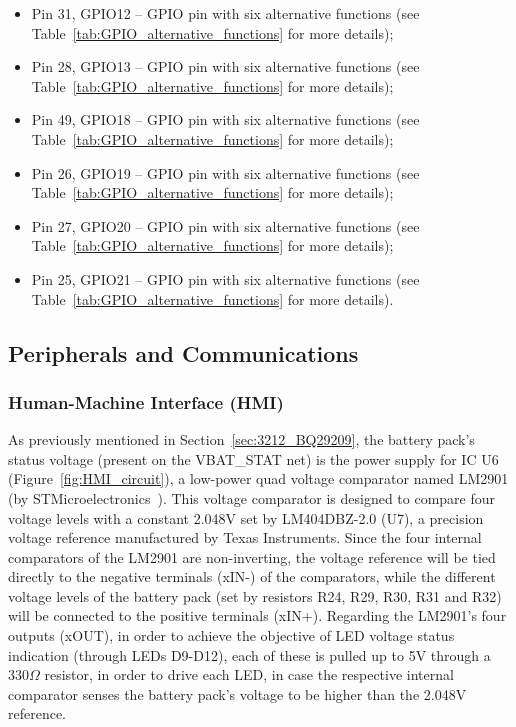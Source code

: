 \begin{itemize}
	\item Pin 31, GPIO12 -- GPIO pin with six alternative functions (see Table~\ref{tab:GPIO_alternative_functions} for more details);

	\item Pin 28, GPIO13 -- GPIO pin with six alternative functions (see Table~\ref{tab:GPIO_alternative_functions} for more details);

	\item Pin 49, GPIO18 -- GPIO pin with six alternative functions (see Table~\ref{tab:GPIO_alternative_functions} for more details);

	\item Pin 26, GPIO19 -- GPIO pin with six alternative functions (see Table~\ref{tab:GPIO_alternative_functions} for more details);

	\item Pin 27, GPIO20 -- GPIO pin with six alternative functions (see Table~\ref{tab:GPIO_alternative_functions} for more details);

	\item Pin 25, GPIO21 -- GPIO pin with six alternative functions (see Table~\ref{tab:GPIO_alternative_functions} for more details).
\end{itemize}


\subsection{Peripherals and Communications}\label{sec:323_PERIPHERALS_COMMS}


\subsubsection{Human-Machine Interface (HMI)}\label{sec:3231_BACKPANEL}

As previously mentioned in Section~\ref{sec:3212_BQ29209}, the battery pack's status voltage (present on the VBAT\_STAT net) is the power supply for IC U6 (Figure~\ref{fig:HMI_circuit}), a low-power quad voltage comparator named LM2901 (by STMicroelectronics~\cite{LM2901}). This voltage comparator is designed to compare four voltage levels with a constant 2.048V set by LM404DBZ-2.0 (U7), a precision voltage reference manufactured by Texas Instruments. Since the four internal comparators of the LM2901 are non-inverting, the voltage reference will be tied directly to the negative terminals (xIN-) of the comparators, while the different voltage levels of the battery pack (set by resistors R24, R29, R30, R31 and R32) will be connected to the positive terminals (xIN+). Regarding the LM2901's four outputs (xOUT), in order to achieve the objective of LED voltage status indication (through LEDs D9-D12), each of these is pulled up to 5V through a 330$\Omega$ resistor, in order to drive each LED, in case the respective internal comparator senses the battery pack's voltage to be higher than the 2.048V reference.

